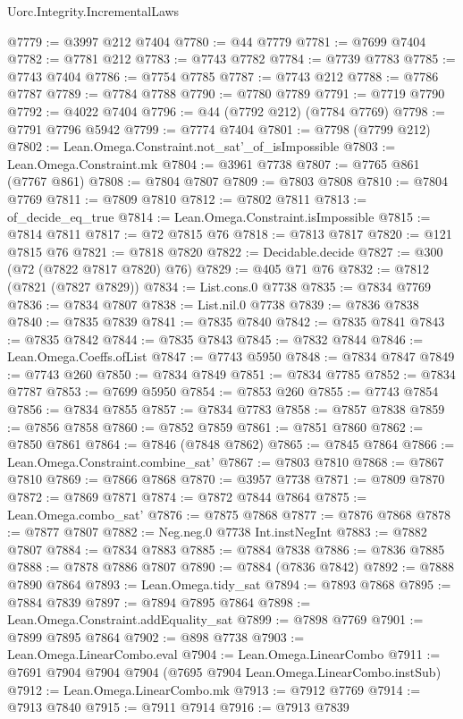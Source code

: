 \begin{lexlean}{Uorc.Integrity.IncrementalLaws}
\begin{coremodule}
@7779 := @3997 @212 @7404
@7780 := @44 @7779
@7781 := @7699 @7404
@7782 := @7781 @212
@7783 := @7743 @7782
@7784 := @7739 @7783
@7785 := @7743 @7404
@7786 := @7754 @7785
@7787 := @7743 @212
@7788 := @7786 @7787
@7789 := @7784 @7788
@7790 := @7780 @7789
@7791 := @7719 @7790
@7792 := @4022 @7404
@7796 := @44 (@7792 @212) (@7784 @7769)
@7798 := @7791 @7796 @5942
@7799 := @7774 @7404
@7801 := @7798 (@7799 @212)
@7802 := Lean.Omega.Constraint.not_sat'_of_isImpossible
@7803 := Lean.Omega.Constraint.mk
@7804 := @3961 @7738
@7807 := @7765 @861 (@7767 @861)
@7808 := @7804 @7807
@7809 := @7803 @7808
@7810 := @7804 @7769
@7811 := @7809 @7810
@7812 := @7802 @7811
@7813 := of_decide_eq_true
@7814 := Lean.Omega.Constraint.isImpossible
@7815 := @7814 @7811
@7817 := @72 @7815 @76
@7818 := @7813 @7817
@7820 := @121 @7815 @76
@7821 := @7818 @7820
@7822 := Decidable.decide
@7827 := @300 (@72 (@7822 @7817 @7820) @76)
@7829 := @405 @71 @76
@7832 := @7812 (@7821 (@7827 @7829))
@7834 := List.cons.{0} @7738
@7835 := @7834 @7769
@7836 := @7834 @7807
@7838 := List.nil.{0} @7738
@7839 := @7836 @7838
@7840 := @7835 @7839
@7841 := @7835 @7840
@7842 := @7835 @7841
@7843 := @7835 @7842
@7844 := @7835 @7843
@7845 := @7832 @7844
@7846 := Lean.Omega.Coeffs.ofList
@7847 := @7743 @5950
@7848 := @7834 @7847
@7849 := @7743 @260
@7850 := @7834 @7849
@7851 := @7834 @7785
@7852 := @7834 @7787
@7853 := @7699 @5950
@7854 := @7853 @260
@7855 := @7743 @7854
@7856 := @7834 @7855
@7857 := @7834 @7783
@7858 := @7857 @7838
@7859 := @7856 @7858
@7860 := @7852 @7859
@7861 := @7851 @7860
@7862 := @7850 @7861
@7864 := @7846 (@7848 @7862)
@7865 := @7845 @7864
@7866 := Lean.Omega.Constraint.combine_sat'
@7867 := @7803 @7810
@7868 := @7867 @7810
@7869 := @7866 @7868
@7870 := @3957 @7738
@7871 := @7809 @7870
@7872 := @7869 @7871
@7874 := @7872 @7844 @7864
@7875 := Lean.Omega.combo_sat'
@7876 := @7875 @7868
@7877 := @7876 @7868
@7878 := @7877 @7807
@7882 := Neg.neg.{0} @7738 Int.instNegInt
@7883 := @7882 @7807
@7884 := @7834 @7883
@7885 := @7884 @7838
@7886 := @7836 @7885
@7888 := @7878 @7886 @7807
@7890 := @7884 (@7836 @7842)
@7892 := @7888 @7890 @7864
@7893 := Lean.Omega.tidy_sat
@7894 := @7893 @7868
@7895 := @7884 @7839
@7897 := @7894 @7895 @7864
@7898 := Lean.Omega.Constraint.addEquality_sat
@7899 := @7898 @7769
@7901 := @7899 @7895 @7864
@7902 := @898 @7738
@7903 := Lean.Omega.LinearCombo.eval
@7904 := Lean.Omega.LinearCombo
@7911 := @7691 @7904 @7904 @7904 (@7695 @7904 Lean.Omega.LinearCombo.instSub)
@7912 := Lean.Omega.LinearCombo.mk
@7913 := @7912 @7769
@7914 := @7913 @7840
@7915 := @7911 @7914
@7916 := @7913 @7839

\end{coremodule}
\end{lexlean}
